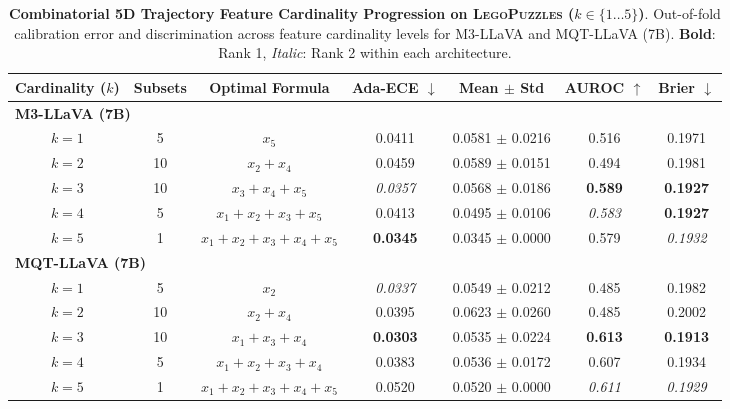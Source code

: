 \begin{table}[t]
\setlength{\tabcolsep}{3.5pt}
\renewcommand{\arraystretch}{1.05}
\centering
\footnotesize
\begin{tabular}{ccccccc}
\toprule
\textbf{Cardinality ($k$)} & \textbf{Subsets} & \textbf{Optimal Formula} & \textbf{Ada-ECE} $\downarrow$ & \textbf{Mean $\pm$ Std} & \textbf{AUROC} $\uparrow$ & \textbf{Brier} $\downarrow$ \\
\midrule
\multicolumn{7}{l}{\textbf{M3-LLaVA (7B)}} \\
\midrule
$k = 1$ & 5 & $x_{5}$ & 0.0411 & 0.0581 $\pm$ 0.0216 & 0.516 & 0.1971 \\
$k = 2$ & 10 & $x_{2} + x_{4}$ & 0.0459 & 0.0589 $\pm$ 0.0151 & 0.494 & 0.1981 \\
$k = 3$ & 10 & $x_{3} + x_{4} + x_{5}$ & \textit{0.0357} & 0.0568 $\pm$ 0.0186 & \textbf{0.589} & \textbf{0.1927} \\
$k = 4$ & 5 & $x_{1} + x_{2} + x_{3} + x_{5}$ & 0.0413 & 0.0495 $\pm$ 0.0106 & \textit{0.583} & \textbf{0.1927} \\
$k = 5$ & 1 & $x_{1} + x_{2} + x_{3} + x_{4} + x_{5}$ & \textbf{0.0345} & 0.0345 $\pm$ 0.0000 & 0.579 & \textit{0.1932} \\
\midrule
\multicolumn{7}{l}{\textbf{MQT-LLaVA (7B)}} \\
\midrule
$k = 1$ & 5 & $x_{2}$ & \textit{0.0337} & 0.0549 $\pm$ 0.0212 & 0.485 & 0.1982 \\
$k = 2$ & 10 & $x_{2} + x_{4}$ & 0.0395 & 0.0623 $\pm$ 0.0260 & 0.485 & 0.2002 \\
$k = 3$ & 10 & $x_{1} + x_{3} + x_{4}$ & \textbf{0.0303} & 0.0535 $\pm$ 0.0224 & \textbf{0.613} & \textbf{0.1913} \\
$k = 4$ & 5 & $x_{1} + x_{2} + x_{3} + x_{4}$ & 0.0383 & 0.0536 $\pm$ 0.0172 & 0.607 & 0.1934 \\
$k = 5$ & 1 & $x_{1} + x_{2} + x_{3} + x_{4} + x_{5}$ & 0.0520 & 0.0520 $\pm$ 0.0000 & \textit{0.611} & \textit{0.1929} \\
\bottomrule
\end{tabular}
\caption{\textbf{Combinatorial 5D Trajectory Feature Cardinality Progression on \textsc{LegoPuzzles} ($k \in \{1 \dots 5\}$)}. Out-of-fold calibration error and discrimination across feature cardinality levels for M3-LLaVA and MQT-LLaVA (7B). \textbf{Bold}: Rank 1, \textit{Italic}: Rank 2 within each architecture.}
\label{tab:ablation_5d_legopuzzles}
\end{table}
